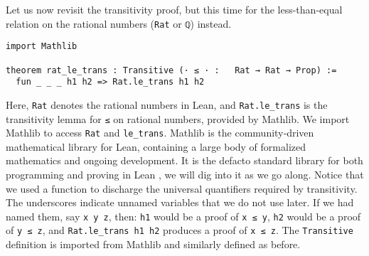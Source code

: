 Let us now revisit the transitivity proof, but this time for the less-than-equal relation on
the rational numbers (\lstinline[language=lean]|Rat| or \lstinline[language=lean]|ℚ|) instead.
\newpage
\begin{lstlisting}[language=lean]
import Mathlib

theorem rat_le_trans : Transitive (· ≤ · :   Rat → Rat → Prop) :=
  fun _ _ _ h1 h2 => Rat.le_trans h1 h2
\end{lstlisting}
Here, \lstinline[language=lean]|Rat| denotes the rational numbers in Lean,
and \lstinline[language=lean]|Rat.le_trans| is the transitivity lemma
for \lstinline[language=lean]|≤| on rational numbers, provided by Mathlib.
We import Mathlib to access \lstinline[language=lean]|Rat|
and \lstinline[language=lean]|le_trans|.
Mathlib is the community‑driven mathematical
library for Lean, containing a large body of formalized mathematics
and ongoing development.
It is the defacto standard library for both programming and proving
in Lean \cite{mathlib2020}, we will dig into it as we go along.
Notice that we used a function to discharge the universal
quantifiers required by transitivity. The underscores indicate
unnamed variables that we do not use later. If we had named
them, say \lstinline|x y z|, then:
\lstinline[language=lean]|h1| would be a proof of \lstinline[language=lean]|x ≤ y|,
\lstinline[language=lean]|h2| would be a proof of \lstinline[language=lean]|y ≤ z|,
and \lstinline[language=lean]|Rat.le_trans h1 h2| produces a proof of \lstinline[language=lean]|x ≤ z|.
The \lstinline[language=lean]|Transitive| definition is imported from Mathlib and similarly
defined as before.
